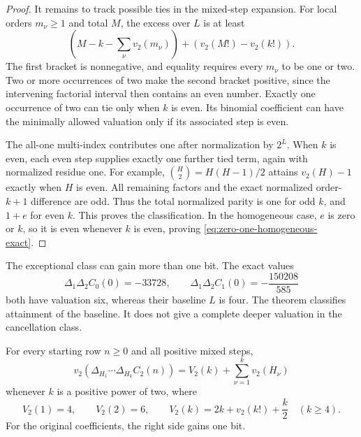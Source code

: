 \begin{proof}
It remains to track possible ties in the mixed-step expansion.
For local orders $m_\nu\geq1$ and total $M$, the excess over $L$ is
at least
\begin{equation}
 \left(M-k-\sum_\nu v_2(m_\nu)\right)
                       +\left(v_2(M!)-v_2(k!)\right).
 \label{eq:zero-one-mixed-excess}
\end{equation}
The first bracket is nonnegative, and equality requires every
$m_\nu$ to be one or two. Two or more occurrences of two make the
second bracket positive, since the intervening factorial interval then
contains an even number. Exactly one occurrence of two can tie only
when $k$ is even. Its binomial coefficient can have the minimally
allowed valuation only if its associated step is even.

The all-one multi-index contributes one after normalization by $2^L$.
When $k$ is even, each even step supplies exactly one further tied term,
again with normalized residue one. For example,
$\binom H2=H(H-1)/2$ attains $v_2(H)-1$ exactly when $H$ is even.
All remaining factors and the exact normalized order-$k+1$ difference
are odd. Thus the total normalized parity is one for odd $k$, and
$1+e$ for even $k$. This proves the classification.
In the homogeneous case, $e$ is zero or $k$, so it is even whenever
$k$ is even, proving \eqref{eq:zero-one-homogeneous-exact}.
\end{proof}

\begin{remark}
The exceptional class can gain more than one bit. The exact values
\[
 \Delta_1\Delta_2C_0(0)=-33728,\qquad
 \Delta_1\Delta_2C_1(0)=-\frac{150208}{585}
\]
both have valuation six, whereas their baseline $L$ is four.
The theorem classifies attainment of the baseline. It does not give a
complete deeper valuation in the cancellation class.
\end{remark}

\begin{theorem}
\label{thm:two-exact-power-orders}
For every starting row $n\geq0$ and all positive mixed steps,
\begin{equation}
 v_2(\Delta_{H_1}\cdots\Delta_{H_k}C_2(n))
       =V_2(k)+\sum_{\nu=1}^k v_2(H_\nu)
 \label{eq:two-power-orders-exact}
\end{equation}
whenever $k$ is a positive power of two, where
\[
 V_2(1)=4,\qquad V_2(2)=6,\qquad
 V_2(k)=2k+v_2(k!)+\frac{k}{2}\quad(k\geq4).
\]
For the original coefficients, the right side gains one bit.
\end{theorem}

